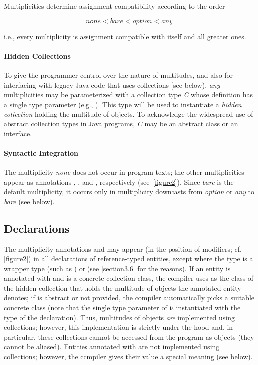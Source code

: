 {\noindent Multiplicities determine assignment compatibility according to the
order

\begin{equation*}
  none < bare < option < any
\end{equation*}

\noindent i.e., every multiplicity is assignment compatible with itself and
all greater ones.

\paragraph{Hidden Collections} To give the programmer control over the nature of
multitudes, and also for interfacing with legacy Java code that uses
collections (see below), \emph{any} multiplicities may be parameterized
with a collection type \emph{C} whose definition has a single type
parameter (e.g., ). This type will be used to instantiate a
\emph{hidden collection} holding the multitude of objects. To
acknowledge the widespread use of abstract collection types in Java
programs, \emph{C} may be an abstract class or an interface.

\paragraph{Syntactic Integration} The multiplicity \emph{none} does not occur in
program texts; the other multiplicities appear as annotations ,
, and , respectively (see~\autoref{figure2}). Since
\emph{bare} is the default multiplicity, it occurs only in multiplicity
downcasts from \emph{option} or \emph{any} to \emph{bare}
(see below).

\subsection{Declarations}
\label{section4.2}

\noindent The multiplicity annotations  and  may
appear (in the position of modifiers; cf. \autoref{figure2}) in all declarations of
reference-typed entities, except where the type is a wrapper type (such as
) or  (see \autoref{section3.6} for the reasons). If an
entity is annotated with  and  is a concrete
collection class, the compiler uses  as the class of the hidden
collection that holds the multitude of objects the annotated entity denotes;
if  is abstract or not provided, the compiler automatically picks a
suitable concrete class (note that the single type parameter of  is
instantiated with the type of the declaration). Thus, multitudes of objects
\emph{are} implemented using collections; however, this implementation
is strictly under the hood and, in particular, these collections cannot be
accessed from the program as objects (they cannot be aliased). Entities
annotated with  are not implemented using collections;
however, the compiler gives their value  a special meaning (see
below).

}
